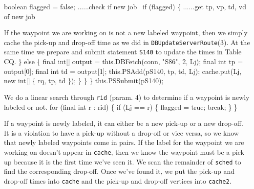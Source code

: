 \documentclass{article}
\def\nwendcode{\endtrivlist \endgroup}      %
\let\nwdocspar=\par
\theoremstyle{definition}                   %
\begin{document}
    boolean flagged = false;
    \LA{}......check if new job~{\nwtagstyle{}}\RA{}
    if (flagged) \{
      \LA{}......get tp, vp, td, vd of new job~{\nwtagstyle{}}\RA{}
\nwendcode{}\nwdocspar
{\small If the waypoint we are working on is not a new labeled waypoint, then
we simply cache the pick-up and drop-off time as we did in
{\tt{}\protect{}\protect{}DBUpdateServerRoute}(3). At the same time we prepare and submit statement
{\tt{}\protect{}S140} to update the times in Table CQ.}
\nwenddocs{}\plusendmoddef
    \} else \{
      final int[] output = this.DBFetch(conn, "S86", 2, Lj);
      final int tp = output[0];
      final int td = output[1];
      this.PSAdd(pS140, tp, td, Lj);
      cache.put(Lj, new int[] \{ rq, tp, td \});
    \}
  \}
\}
this.PSSubmit(pS140);
\nwendcode{}\nwdocspar
{\small We do a linear search through {\tt{}rid} (param. 4) to determine if a
waypoint is newly labeled or not.}
\nwenddocs{}\endmoddef{}
for (final int r : rid) \{
  if (Lj == r) \{
    flagged = true;
    break;
  \}
\}
\nwendcode{}\nwdocspar
{\small If a waypoint is newly labeled, it can either be a new pick-up or a new
drop-off. It is a violation to have a pick-up without a drop-off or vice versa,
so we know that newly labeled waypoints come in pairs. If the label for the
waypoint we are working on doesn't appear in {\tt{}cache}, then we know the
waypoint must be a pick-up because it is the first time we've seen it.  We scan
the remainder of {\tt{}sched} to find the corresponding drop-off. Once we've found
it, we put the pick-up and drop-off times into {\tt{}cache} and the pick-up and
drop-off vertices into {\tt{}cache2}.}
\end{document}

